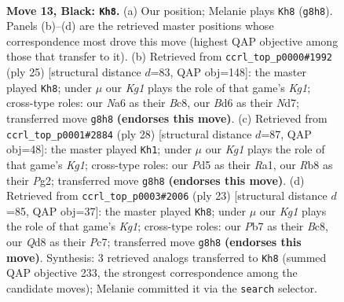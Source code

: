 \documentclass[11pt]{article}
\begin{document}
\begin{figure}[p]
\label{fig:thought-m23}
\end{figure}

\clearpage

\begin{figure}[p]\centering
\begin{subfigure}{0.46\textwidth}\centering
\resizebox{\linewidth}{!}{%
\newchessgame
\chessboard[
  setfen={1rbq1rk1/pp5p/n1pb2p1/3p1p1n/3P1P2/P4NP1/1P1NP1BP/R1BQR1K1 b - - 0 13},
  showmover=false,
  pgfstyle=straightmove, color=movearrow, markmove={g8-h8}
]}
\caption{}
\end{subfigure}\hfill
\begin{subfigure}{0.46\textwidth}\centering
\resizebox{\linewidth}{!}{%
\newchessgame
\chessboard[
  setfen={r1bq1rk1/1p1nb1pp/p1n1p3/3pPp2/1P1P4/P2B1N2/3N1PPP/R1BQR2K b - - 1 13},
  showmover=false,
  pgfstyle=straightmove, color=movearrow, markmove={g8-h8}
]}
\caption{}
\end{subfigure}
\\[4pt]
\begin{subfigure}{0.46\textwidth}\centering
\resizebox{\linewidth}{!}{%
\newchessgame
\chessboard[
  setfen={r2qr1k1/3nbpp1/pp1p1n2/3Pp2p/P7/1N2BP2/1PPQB1PP/R4RK1 w - - 1 15},
  showmover=false,
  pgfstyle=straightmove, color=movearrow, markmove={g1-h1}
]}
\caption{}
\end{subfigure}\hfill
\begin{subfigure}{0.46\textwidth}\centering
\resizebox{\linewidth}{!}{%
\newchessgame
\chessboard[
  setfen={r1b2rk1/1ppn1qpp/p1nbp3/3p4/3P4/1BP2N2/PP1N1PPP/R1BQR1K1 b - - 6 12},
  showmover=false,
  pgfstyle=straightmove, color=movearrow, markmove={g8-h8}
]}
\caption{}
\end{subfigure}
\caption{\textbf{Move 13, Black: \texttt{Kh8}.} (a) Our position; Melanie plays \texttt{Kh8} (\texttt{g8h8}). Panels (b)--(d) are the retrieved master positions whose correspondence most drove this move (highest QAP objective among those that transfer to it). (b) Retrieved from \texttt{ccrl\_top\_p0000\#1992} (ply 25) [structural distance $d$=83, QAP obj=148]: the master played \texttt{Kh8}; under $\mu$ our \emph{Kg1} plays the role of that game's \emph{Kg1}; cross-type roles: our \emph{N}a6 as their \emph{B}c8, our \emph{B}d6 as their \emph{N}d7; transferred move \texttt{g8h8} \textbf{(endorses this move)}. (c) Retrieved from \texttt{ccrl\_top\_p0001\#2884} (ply 28) [structural distance $d$=87, QAP obj=48]: the master played \texttt{Kh1}; under $\mu$ our \emph{Kg1} plays the role of that game's \emph{Kg1}; cross-type roles: our \emph{P}d5 as their \emph{R}a1, our \emph{R}b8 as their \emph{P}g2; transferred move \texttt{g8h8} \textbf{(endorses this move)}. (d) Retrieved from \texttt{ccrl\_top\_p0003\#2006} (ply 23) [structural distance $d$=85, QAP obj=37]: the master played \texttt{Kh8}; under $\mu$ our \emph{Kg1} plays the role of that game's \emph{Kg1}; cross-type roles: our \emph{P}b7 as their \emph{B}c8, our \emph{Q}d8 as their \emph{P}c7; transferred move \texttt{g8h8} \textbf{(endorses this move)}. Synthesis: 3 retrieved analogs transferred to \texttt{Kh8} (summed QAP objective 233, the strongest correspondence among the candidate moves); Melanie committed it via the \texttt{search} selector.}

\end{figure}
\end{document}
